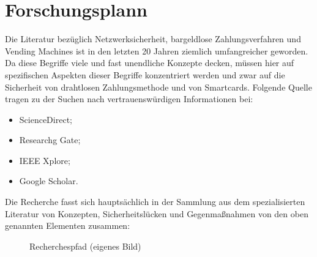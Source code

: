 \section{Forschungsplann}

Die Literatur bezüglich Netzwerksicherheit, bargeldlose Zahlungsverfahren und Vending Machines ist 
in den letzten 20 Jahren ziemlich umfangreicher geworden. Da diese Begriffe viele und fast unendliche 
Konzepte decken, müssen hier auf spezifischen Aspekten dieser Begriffe konzentriert werden und zwar 
auf die Sicherheit von drahtlosen Zahlungsmethode und von Smartcards. Folgende Quelle tragen zu der
Suchen nach vertrauenswürdigen Informationen bei:

\begin{itemize}
    \item ScienceDirect;
    \item Researchg Gate;
    \item IEEE Xplore;
    \item Google Scholar.
\end{itemize}

Die Recherche fasst sich hauptsächlich in der Sammlung aus dem spezialisierten Literatur von Konzepten,
Sicherheitslücken und Gegenmaßnahmen von den oben genannten Elementen zusammen:

\vfill
\begin{figure}[htb]
    \caption{Recherchespfad (eigenes Bild)}
    \label{fig:diagramrecherche}
\end{figure}
\vfill
